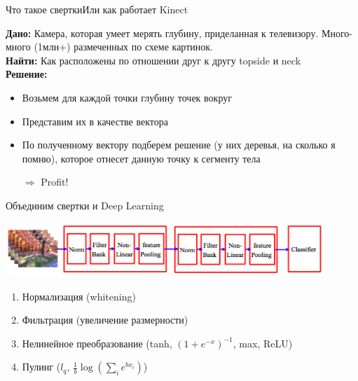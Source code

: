 \documentclass[14pt, fleqn, xcolor={dvipsnames, table}]{beamer}
\begin{document}
\begin{frame}{Что такое свертки}{Или как работает Kinect}
 {
\textbf{Дано:} Камера, которая умеет мерять глубину, приделанная к телевизору. Много-много (1млн+) размеченных по схеме картинок.\\
\textbf{Найти:} Как расположены по отношении друг к другу topside и neck\\
\textbf{Решение:}\small
\begin{itemize}
\item Возьмем для каждой точки глубину точек вокруг
\item Представим их в качестве вектора
\item По полученному вектору подберем решение (у них деревья, на сколько я помню), которое отнесет данную точку к сегменту тела
\item[$\Rightarrow$] Profit!
\end{itemize}
}
\end{frame}

\begin{frame}{Объединим свертки и Deep Learning}
\begin{center}
\includegraphics[width=0.9\textwidth]{convolution-scheme.png}
\end{center}
\begin{enumerate}\small
  \item Нормализация (whitening)
  \item Фильтрация (увеличение размерности)
  \item Нелинейное преобразование (tanh, $(1 + e^{-x})^{-1}$, max, ReLU)
  \item Пулинг ($l_q$, $\frac{1}{b}\log\left(\sum_i e^{b x_i}\right)$)
\end{enumerate}
\end{frame}
\end{document}
